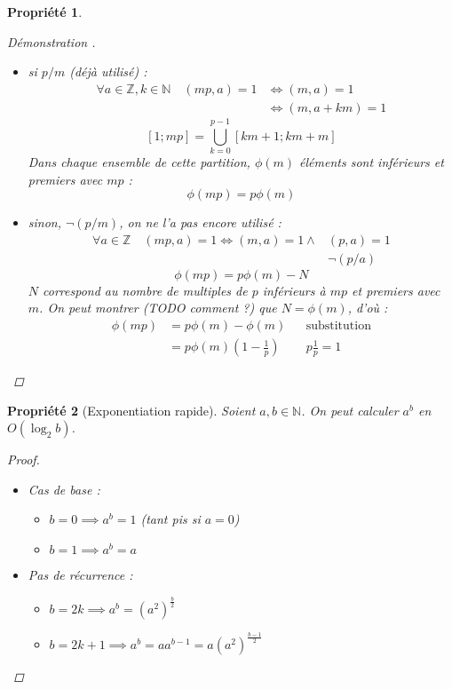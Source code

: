 \documentclass[11pt,twocolumn]{article}
\theoremstyle{plain}
\newtheorem{pr}{Propriété}
\newcommand{\esN}{\mathbb{N}} %
\newcommand{\esZ}{\mathbb{Z}} %
\newcommand{\dbi}{\Longleftrightarrow}
\newenvironment{cproof}[1]{\begin{proof}[Démonstration \cite{#1}]}{\end{proof}}
\begin{document}
\begin{pr}
\begin{cproof}{Buys}
\begin{itemize}
			\item si $p/m$ (déjà utilisé) :
				\begin{align*}
					\forall a \in \esZ, k \in \esN \quad (mp,a)=1
					&\dbi (m,a)=1 \\
					&\dbi (m,a+km)=1
				\end{align*}
				\[
					[1;mp] = \bigcup_{k=0}^{p-1}[km+1;km+m]
				\]
				Dans chaque ensemble de cette partition,
				$\phi(m)$ éléments sont inférieurs et
				premiers avec $mp$ : \[
					\phi(mp)=p\phi(m)
				\]
			\item sinon, $\lnot(p/m)$, on ne l'a pas encore utilisé :
				\begin{align*}
					\forall a \in \esZ \quad (mp,a)=1
					\dbi (m,a)=1 \land& (p,a)=1 \\
					& \lnot(p/a)
				\end{align*}
				\[
					\phi(mp)=p\phi(m)-N
				\]
				$N$ correspond au nombre de multiples de $p$
				inférieurs à $mp$ et premiers avec $m$.
				On peut montrer (TODO comment ?) que $N=\phi(m)$, d'où :
				\begin{align*}
					\phi(mp) &= p\phi(m) - \phi(m) && \text{substitution} \\
					&= p\phi(m)\left(1-\frac1p\right) && p\frac1p=1
				\end{align*}
		\end{itemize}
	\end{cproof}
\end{pr}
\begin{pr}[Exponentiation rapide]\label{pr:fastexp}
	Soient $a,b \in \esN$.
	On peut calculer $a^b$ en $O(\log_2b)$.
	\begin{proof} ~
		\begin{itemize}
			\item Cas de base :
				\begin{itemize}
					\item $b=0 \implies a^b = 1$ (tant pis si $a=0$)
					\item $b=1 \implies a^b = a$
				\end{itemize}
			\item Pas de récurrence :
				\begin{itemize}
					\item $b=2k \implies a^b =
						\left(a^2\right)^\frac{b}2$
					\item $b=2k+1 \implies a^b =
						aa^{b-1}=a\left(a^2\right)^{\frac{b-1}2}$
				\end{itemize}
		\end{itemize}
	\end{proof}
\end{pr}
\end{document}
